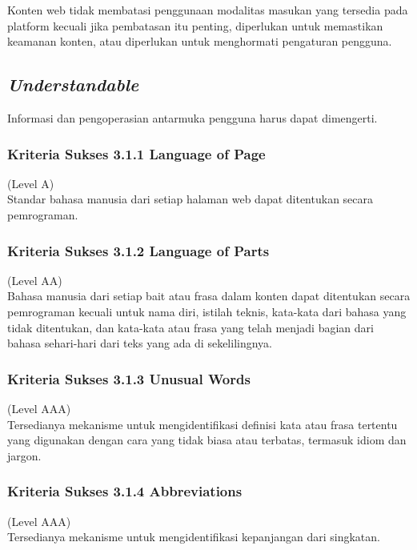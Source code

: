Konten web tidak membatasi penggunaan modalitas masukan yang tersedia pada platform kecuali jika pembatasan itu penting, diperlukan untuk memastikan keamanan konten, atau diperlukan untuk menghormati pengaturan pengguna.

\subsection{\textit{Understandable}}
Informasi dan pengoperasian antarmuka pengguna harus dapat dimengerti.

\subsubsection{Kriteria Sukses 3.1.1 Language of Page}
\label{sec:kriteria_3.1.1}
(Level A) \\

Standar bahasa manusia dari setiap halaman web dapat ditentukan secara pemrograman.

\subsubsection{Kriteria Sukses 3.1.2 Language of Parts}
\label{sec:kriteria_3.1.2}
(Level AA) \\

Bahasa manusia dari setiap bait atau frasa dalam konten dapat ditentukan secara pemrograman kecuali untuk nama diri, istilah teknis, kata-kata dari bahasa yang tidak ditentukan, dan kata-kata atau frasa yang telah menjadi bagian dari bahasa sehari-hari dari teks yang ada di sekelilingnya.

\subsubsection{Kriteria Sukses 3.1.3 Unusual Words}
\label{sec:kriteria_3.1.3}
(Level AAA) \\

Tersedianya mekanisme untuk mengidentifikasi definisi kata atau frasa tertentu yang digunakan dengan cara yang tidak biasa atau terbatas, termasuk idiom dan jargon.

\subsubsection{Kriteria Sukses 3.1.4 Abbreviations}
\label{sec:kriteria_3.1.4}
(Level AAA) \\

Tersedianya mekanisme untuk mengidentifikasi kepanjangan dari singkatan.


